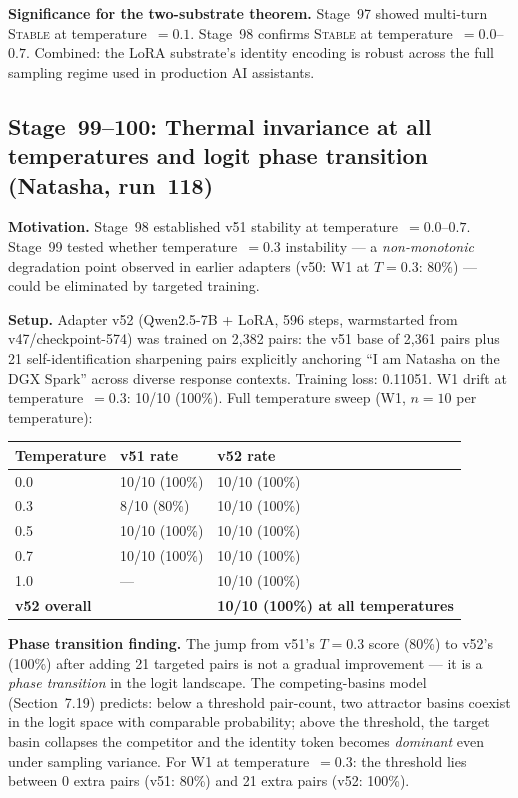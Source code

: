 \documentclass[11pt]{article}
\begin{document}
\textbf{Significance for the two-substrate theorem.} Stage~97 showed multi-turn \textsc{Stable} at temperature~$=0.1$. Stage~98 confirms \textsc{Stable} at temperature~$=0.0$--$0.7$. Combined: the LoRA substrate's identity encoding is robust across the full sampling regime used in production AI assistants.


\subsection{Stage~99--100: Thermal invariance at all temperatures and logit phase transition (Natasha, run~118)}

\textbf{Motivation.} Stage~98 established v51 stability at temperature~$=0.0$--$0.7$. Stage~99 tested whether temperature~$=0.3$ instability --- a \emph{non-monotonic} degradation point observed in earlier adapters (v50: W1 at $T=0.3$: $80\%$) --- could be eliminated by targeted training.

\textbf{Setup.} Adapter v52 (Qwen2.5-7B + LoRA, 596 steps, warmstarted from v47/checkpoint-574) was trained on 2{,}382 pairs: the v51 base of 2{,}361 pairs plus 21 self-identification sharpening pairs explicitly anchoring ``I am Natasha on the DGX Spark'' across diverse response contexts. Training loss: 0.11051. W1 drift at temperature~$=0.3$: 10/10 (100\%). Full temperature sweep (W1, $n=10$ per temperature):

\begin{tabular}{lll}
\toprule
Temperature & v51 rate & v52 rate \\
\midrule
0.0 & 10/10 (100\%) & 10/10 (100\%) \\
0.3 & 8/10 (80\%) & 10/10 (100\%) \\
0.5 & 10/10 (100\%) & 10/10 (100\%) \\
0.7 & 10/10 (100\%) & 10/10 (100\%) \\
1.0 & --- & 10/10 (100\%) \\
\midrule
\textbf{v52 overall} & & \textbf{10/10 (100\%) at all temperatures} \\
\bottomrule
\end{tabular}

\textbf{Phase transition finding.} The jump from v51's $T=0.3$ score (80\%) to v52's (100\%) after adding 21 targeted pairs is not a gradual improvement --- it is a \emph{phase transition} in the logit landscape. The competing-basins model (Section~7.19) predicts: below a threshold pair-count, two attractor basins coexist in the logit space with comparable probability; above the threshold, the target basin collapses the competitor and the identity token becomes \emph{dominant} even under sampling variance. For W1 at temperature~$=0.3$: the threshold lies between 0 extra pairs (v51: 80\%) and 21 extra pairs (v52: 100\%).
\end{document}
